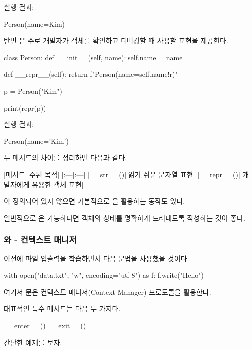 실행 결과:

\begin{dhkzsh}
Person(name=Kim)
\end{dhkzsh}

반면 은 주로 개발자가 객체를 확인하고 디버깅할 때 사용할 표현을 제공한다.

\begin{dhkcode}
class Person:
    def __init__(self, name):
        self.name = name

    def __repr__(self):
        return f"Person(name={self.name!r})"

p = Person("Kim")

print(repr(p))
\end{dhkcode}

실행 결과:

\begin{dhkzsh}
Person(name='Kim')
\end{dhkzsh}

두 메서드의 차이를 정리하면 다음과 같다.

\begin{dhktable}
|메서드|	주된 목적|
|:---|:---|
|__str__()|	읽기 쉬운 문자열 표현|
|__repr__()|	개발자에게 유용한 객체 표현|
\end{dhktable}

이 정의되어 있지 않으면 기본적으로 을 활용하는 동작도 있다.

일반적으로 은 가능하다면 객체의 상태를 명확하게 드러내도록 작성하는 것이 좋다.

\subsubsection{와  - 컨텍스트 매니저}

이전에 파일 입출력을 학습하면서 다음 문법을 사용했을 것이다.

\begin{dhkcode}
with open("data.txt", "w", encoding="utf-8") as f:
    f.write("Hello")
\end{dhkcode}

여기서 문은 컨텍스트 매니저(Context Manager) 프로토콜을 활용한다.

대표적인 특수 메서드는 다음 두 가지다.

\begin{dhkcode}
__enter__()
__exit__()
\end{dhkcode}

간단한 예제를 보자.

